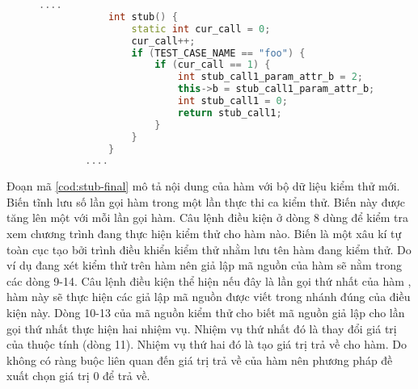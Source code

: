 \vspace{5mm}
\begin{figure}[h]
	\begin{lstlisting}[language=C++, caption={Sự thay đổi của hàm \tcode{stub} với bộ dữ liệu kiểm thử mới.}, label={cod:stub-final}, captionpos=b]
		....
			int stub() {
				static int cur_call = 0;
				cur_call++;
				if (TEST_CASE_NAME == "foo") {
					if (cur_call == 1) {
						int stub_call1_param_attr_b = 2;
						this->b = stub_call1_param_attr_b;
						int stub_call1 = 0;
						return stub_call1;
					}
				}
			}
		....
	\end{lstlisting}
\end{figure}

Đoạn mã \ref{cod:stub-final} mô tả nội dung của hàm  với bộ dữ liệu kiểm thử mới. Biến tĩnh  lưu số lần gọi hàm trong một lần thực thi ca kiểm thử. Biến này được tăng lên một với mỗi lần gọi hàm. Câu lệnh điều kiện ở dòng 8 dùng để kiểm tra xem chương trình đang thực hiện kiểm thử cho hàm nào. Biến  là một xâu kí tự toàn cục tạo bởi trình điều khiển kiểm thử nhằm lưu tên hàm đang kiểm thử. Do ví dụ đang xét kiểm thử trên hàm  nên giả lập mã nguồn của hàm  sẽ nằm trong các dòng 9-14. Câu lệnh điều kiện  thể hiện nếu đây là lần gọi thứ nhất của hàm , hàm này sẽ thực hiện các giả lập mã nguồn được viết trong nhánh đúng của điều kiện này. Dòng 10-13 của mã nguồn kiểm thử cho biết mã nguồn giả lập cho lần gọi thứ nhất thực hiện hai nhiệm vụ. Nhiệm vụ thứ nhất đó là thay đổi giá trị của thuộc tính  (dòng 11). Nhiệm vụ thứ hai đó là tạo giá trị trả về cho hàm. Do không có ràng buộc liên quan đến giá trị trả về của hàm  nên phương pháp đề xuất chọn giá trị 0 để trả về.